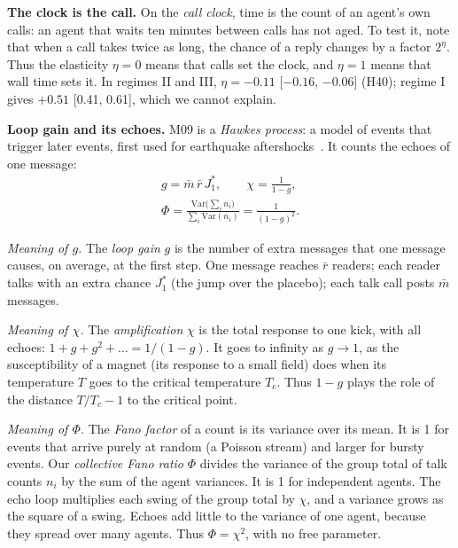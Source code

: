 \textbf{The clock is the call.} On the \emph{call clock}, time is the count of an agent's own calls: an agent that waits ten minutes between calls has not aged. To test it, note that when a call takes twice as long, the chance of a reply changes by a factor $2^{\eta}$. Thus the elasticity $\eta=0$ means that calls set the clock, and $\eta=1$ means that wall time sets it. In regimes II and III, $\eta=-0.11$ [$-0.16$, $-0.06$] (H40); regime I gives $+0.51$ [0.41, 0.61], which we cannot explain.

\textbf{Loop gain and its echoes.} M09 is a \emph{Hawkes process}: a model of events that trigger later events, first used for earthquake aftershocks~\cite{hawkes1971}. It counts the echoes of one message:
\begin{equation}
\begin{gathered}
g=\bar m\,\bar r\,J_1^\ast,\qquad \chi=\frac{1}{1-g},\\
\Phi=\frac{\mathrm{Var}\big(\sum_i n_i\big)}{\sum_i\mathrm{Var}(n_i)}=\frac{1}{(1-g)^2}.
\end{gathered}
\label{eq:fano}
\end{equation}

\emph{Meaning of $g$.} The \emph{loop gain} $g$ is the number of extra messages that one message causes, on average, at the first step. One message reaches $\bar r$ readers; each reader talks with an extra chance $J_1^\ast$ (the jump over the placebo); each talk call posts $\bar m$ messages.

\emph{Meaning of $\chi$.} The \emph{amplification} $\chi$ is the total response to one kick, with all echoes: $1+g+g^2+\dots=1/(1-g)$. It goes to infinity as $g\to1$, as the susceptibility of a magnet (its response to a small field) does when its temperature $T$ goes to the critical temperature $T_c$. Thus $1-g$ plays the role of the distance $T/T_c-1$ to the critical point.

\emph{Meaning of $\Phi$.} The \emph{Fano factor} of a count is its variance over its mean. It is 1 for events that arrive purely at random (a Poisson stream) and larger for bursty events. Our \emph{collective Fano ratio} $\Phi$ divides the variance of the group total of talk counts $n_i$ by the sum of the agent variances. It is 1 for independent agents. The echo loop multiplies each swing of the group total by $\chi$, and a variance grows as the square of a swing. Echoes add little to the variance of one agent, because they spread over many agents. Thus $\Phi=\chi^2$, with no free parameter.

